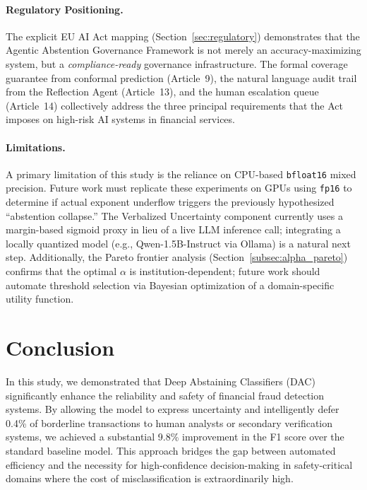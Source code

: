 \documentclass[12pt,a4paper]{article}
\begin{document}
\paragraph{Regulatory Positioning.}
The explicit EU AI Act mapping (Section~\ref{sec:regulatory}) demonstrates that
the Agentic Abstention Governance Framework is not merely an accuracy-maximizing
system, but a \textit{compliance-ready} governance infrastructure. The formal
coverage guarantee from conformal prediction (Article~9), the natural language
audit trail from the Reflection Agent (Article~13), and the human escalation
queue (Article~14) collectively address the three principal requirements that
the Act imposes on high-risk AI systems in financial services.

\paragraph{Limitations.}
A primary limitation of this study is the reliance on CPU-based \texttt{bfloat16}
mixed precision. Future work must replicate these experiments on GPUs using
\texttt{fp16} to determine if actual exponent underflow triggers the previously
hypothesized ``abstention collapse.'' The Verbalized Uncertainty component
currently uses a margin-based sigmoid proxy in lieu of a live LLM inference call;
integrating a locally quantized model (e.g., Qwen-1.5B-Instruct via Ollama) is
a natural next step. Additionally, the Pareto frontier analysis
(Section~\ref{subsec:alpha_pareto}) confirms that the optimal $\alpha$ is
institution-dependent; future work should automate threshold selection via
Bayesian optimization of a domain-specific utility function.

\section{Conclusion}
\label{sec:conclusion}

In this study, we demonstrated that Deep Abstaining Classifiers (DAC)
significantly enhance the reliability and safety of financial fraud detection
systems. By allowing the model to express uncertainty and intelligently defer
0.4\% of borderline transactions to human analysts or secondary verification
systems, we achieved a substantial 9.8\% improvement in the F1 score over the
standard baseline model. This approach bridges the gap between automated
efficiency and the necessity for high-confidence decision-making in
safety-critical domains where the cost of misclassification is extraordinarily
high.
\end{document}
